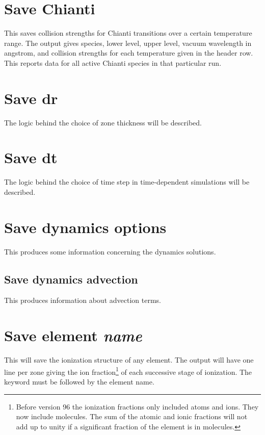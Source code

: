 \section{Save Chianti}
\label{sec:CommandSaveChianti}

This saves collision strengths for Chianti transitions over a certain temperature range.
The output gives species, lower level, upper level, vacuum wavelength in angstrom, 
and collision strengths for each temperature given in the header row.
This reports data for all active Chianti species in that particular run.

\section{Save dr}

The logic behind the choice of zone thickness will be described.

\section{Save dt}

The logic behind the choice of time step in time-dependent simulations will be described.

\section{Save dynamics options}

This produces some information concerning the dynamics solutions.

\subsection{Save dynamics advection}

This produces information about advection terms.

\section{Save element \emph{name}}

This will save the ionization structure of any element. The output will
have one line per zone giving the ion fraction\footnote{Before version 96 the ionization fractions only included atoms and
ions.  They now include molecules.  The sum of the atomic and ionic fractions
will not add up to unity if a significant fraction of the element is in
molecules.} of each successive stage
of ionization.  The keyword  must be followed by the element name.

